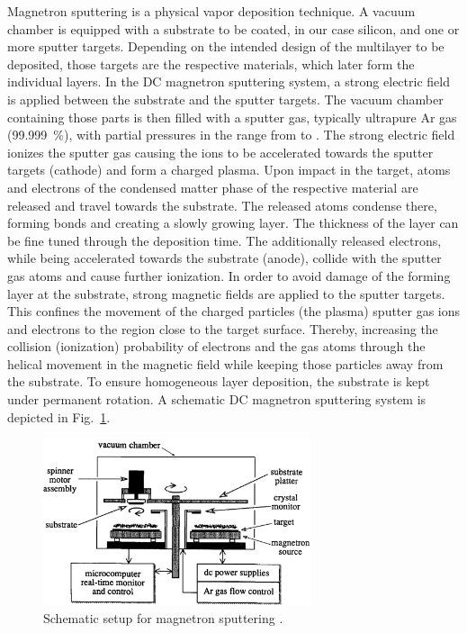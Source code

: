 Magnetron sputtering is a physical vapor deposition technique. A vacuum chamber is equipped with a substrate to be coated, in our case silicon, and one or more sputter targets. Depending on the intended design of the multilayer to be deposited, those targets are the respective materials, which later form the individual layers. In the DC magnetron sputtering system, a strong electric field is applied between the substrate and the sputter targets. The vacuum chamber containing those parts is then filled with a sputter gas, typically ultrapure Ar gas (\SI{99.999}{\percent}), with partial pressures in the range from  to  \cite{stearns_fabrication_1991}. The strong electric field ionizes the sputter gas causing the ions to be accelerated towards the sputter targets (cathode) and form a charged plasma. Upon impact in the target, atoms and electrons of the condensed matter phase of the respective material are released and travel towards the substrate. The released atoms condense there, forming bonds and creating a slowly growing layer. The thickness of the layer can be fine tuned through the deposition time. The additionally released electrons, while being accelerated towards the substrate (anode), collide with the sputter gas atoms and cause further ionization. In order to avoid damage of the forming layer at the substrate, strong magnetic fields are applied to the sputter targets. This confines the movement of the charged particles (the plasma) sputter gas ions and electrons to the region close to the target surface. Thereby, increasing the collision (ionization) probability of electrons and the gas atoms through the helical movement in the magnetic field while keeping those particles away from the substrate. To ensure homogeneous layer deposition, the substrate is kept under permanent rotation. A schematic DC magnetron sputtering system is depicted in Fig.~\ref{ch_exp:magnetron_sputtering_schematic}.
\begin{figure}[htb]
        \includegraphics[width=0.7\textwidth]{img/magnetron_sputtering_schematic.png}
        \caption[Schematic setup for magnetron sputtering.]{%
            Schematic setup for magnetron sputtering \cite{stearns_fabrication_1991}.}
        \label{ch_exp:magnetron_sputtering_schematic}
\end{figure}



